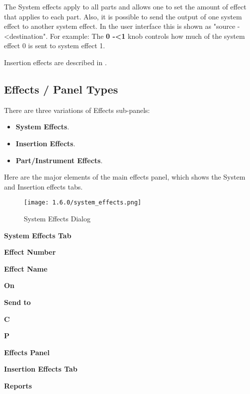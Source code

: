    The System effects apply to all parts and allows one to set the amount of
   effect that applies to each part. Also, it is possible to send the output
   of one system effect to another system effect. In the user interface this
   is shown as "source -\textless destination". For example:
   The \textbf{0 -\textless 1} knob controls how
   much of the system effect 0 is sent to system effect 1.

   Insertion effects are described in
   .

\subsection{Effects / Panel Types}
\label{subsec:effects_paneltypes}

   There are three variations of Effects sub-panels:

   \begin{itemize}
      \item \textbf{System Effects}.
      \item \textbf{Insertion Effects}.
      \item \textbf{Part/Instrument Effects}.
   \end{itemize}

   Here are the major elements of the main effects panel, which shows the
   System and Insertion effects tabs.

\begin{figure}[H]
   \centering
   \texttt{[image: 1.6.0/system\_effects.png]}
   \caption{System Effects Dialog}
   \label{fig:system_effects_dialog}
\end{figure}

   \begin{enumber}
      \item \textbf{System Effects Tab}
      \item \textbf{Effect Number}
      \item \textbf{Effect Name}
      \item \textbf{On}
      \item \textbf{Send to}
      \item \textbf{C}
      \item \textbf{P}
      \item \textbf{Effects Panel}
      \item \textbf{Insertion Effects Tab}
      \item \textbf{Reports}
   \end{enumber}

